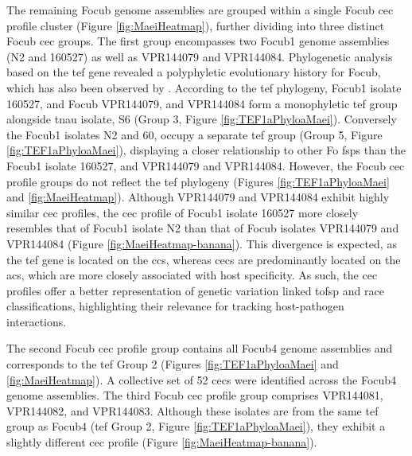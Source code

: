 The remaining \ac{Focub} genome assemblies are grouped within a single \ac{Focub} \ac{cec} profile cluster (Figure \ref{fig:MaeiHeatmap}), further dividing into three distinct \ac{Focub} \ac{cec} groups. The first group encompasses two \ac{Focub1} genome assemblies (N2 and 160527) as well as VPR144079 and VPR144084. Phylogenetic analysis based on the \ac{tef} gene revealed a polyphyletic evolutionary history for \ac{Focub}, which has also been observed by \textcite{Odonnell1998, Groenewald2006, Fourie2009, Maryani2019, Mostert2022}. According to the \ac{tef} phylogeny, \ac{Focub1} isolate 160527, and \ac{Focub} VPR144079, and VPR144084 form a monophyletic \ac{tef} group alongside \ac{tnau} isolate, S6 (Group 3, Figure \ref{fig:TEF1aPhyloaMaei}). Conversely the \ac{Focub1} isolates N2 and 60, occupy a separate \ac{tef} group (Group 5, Figure \ref{fig:TEF1aPhyloaMaei}), displaying a closer relationship to other \ac{Fo} \acp{fsp} than the \ac{Focub1} isolate 160527, and VPR144079 and VPR144084. However, the \ac{Focub} \ac{cec} profile groups do not reflect the \ac{tef} phylogeny (Figures  \ref{fig:TEF1aPhyloaMaei} and \ref{fig:MaeiHeatmap}). Although VPR144079 and VPR144084 exhibit highly similar \ac{cec} profiles, the \ac{cec} profile of \ac{Focub1} isolate 160527 more closely resembles that of \ac{Focub1} isolate N2 than that of \ac{Focub} isolates VPR144079 and VPR144084 (Figure \ref{fig:MaeiHeatmap-banana}). This divergence is expected, as the \ac{tef} gene is located on the \acp{cc}, whereas \acp{cec} are predominantly located on the \acp{ac}, which are more closely associated with host specificity. As such, the \ac{cec} profiles offer a better representation of genetic variation linked to\ac{fsp} and race classifications, highlighting their relevance for tracking host-pathogen interactions.

The second \ac{Focub} \ac{cec} profile group contains all \ac{Focub4} genome assemblies and corresponds to the \ac{tef} Group 2 (Figures  \ref{fig:TEF1aPhyloaMaei} and \ref{fig:MaeiHeatmap}). A collective set of 52 \acp{cec} were identified across the \ac{Focub4} genome assemblies. The third  \ac{Focub} \ac{cec} profile group comprises VPR144081, VPR144082, and VPR144083. Although these isolates are from the same \ac{tef} group as \ac{Focub4} (\ac{tef} Group 2, Figure \ref{fig:TEF1aPhyloaMaei}), they exhibit a slightly different \ac{cec} profile (Figure \ref{fig:MaeiHeatmap-banana}). 

